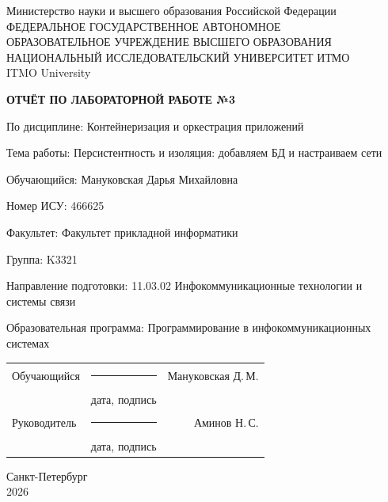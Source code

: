 \documentclass[14pt,a4paper,oneside]{extreport}
\newcommand{\LabNumber}{3}
\newcommand{\LabTitle}{Персистентность и изоляция: добавляем БД и настраиваем сети}
\newcommand{\CourseName}{Контейнеризация и оркестрация приложений}
\newcommand{\StudentName}{Мануковская Дарья Михайловна}
\newcommand{\StudentShortName}{Мануковская Д.\,М.}
\newcommand{\StudentISU}{466625}
\newcommand{\StudentGroup}{K3321}
\newcommand{\FacultyName}{Факультет прикладной информатики}
\newcommand{\DegreeProgramme}{11.03.02 Инфокоммуникационные технологии и
системы связи}
\newcommand{\EducationProgramme}{Программирование в
инфокоммуникационных системах}
\newcommand{\TeacherName}{Аминов Н.\,С.}
\newcommand{\ReportCity}{Санкт-Петербург}
\newcommand{\ReportYear}{2026}
\begin{document}
\begin{titlepage}
  \thispagestyle{empty}
  \begin{center}
    \fontsize{12pt}{16pt}\selectfont
    Министерство науки и высшего образования Российской Федерации\\[0.25\baselineskip]
    ФЕДЕРАЛЬНОЕ ГОСУДАРСТВЕННОЕ АВТОНОМНОЕ\\
    ОБРАЗОВАТЕЛЬНОЕ УЧРЕЖДЕНИЕ ВЫСШЕГО ОБРАЗОВАНИЯ\\[0.25\baselineskip]
    НАЦИОНАЛЬНЫЙ ИССЛЕДОВАТЕЛЬСКИЙ УНИВЕРСИТЕТ ИТМО\\
    ITMO University
  \end{center}
  \vspace{0.8\baselineskip}
  \begin{center}
    \textbf{ОТЧЁТ ПО ЛАБОРАТОРНОЙ РАБОТЕ №\LabNumber}
  \end{center}
  \vspace{0.4\baselineskip}
  \begingroup
  \setlength{\parindent}{0pt}
  По дисциплине: \CourseName\par\medskip
  Тема работы: \LabTitle\par\medskip
  Обучающийся: \StudentName\par\medskip
  Номер ИСУ: \StudentISU\par\medskip
  Факультет: \FacultyName\par\medskip
  Группа: \StudentGroup\par\medskip
  Направление подготовки: \DegreeProgramme\par\medskip
  Образовательная программа: \EducationProgramme\par
  \endgroup
  \vfill
  \begin{tabularx}{\textwidth}{@{}l>{\centering\arraybackslash}Xr@{}}
    Обучающийся & \rule{25mm}{0.4pt} & \StudentShortName\\
    & {\fontsize{12pt}{14pt}\selectfont дата, подпись} &\\[0.4\baselineskip]
    Руководитель & \rule{25mm}{0.4pt} & \TeacherName\\
    & {\fontsize{12pt}{14pt}\selectfont дата, подпись} &
  \end{tabularx}
  \vfill
  \begin{center}
    \ReportCity\\
    \ReportYear
  \end{center}
\end{titlepage}
\setcounter{page}{2}
\tableofcontents

\end{document}
